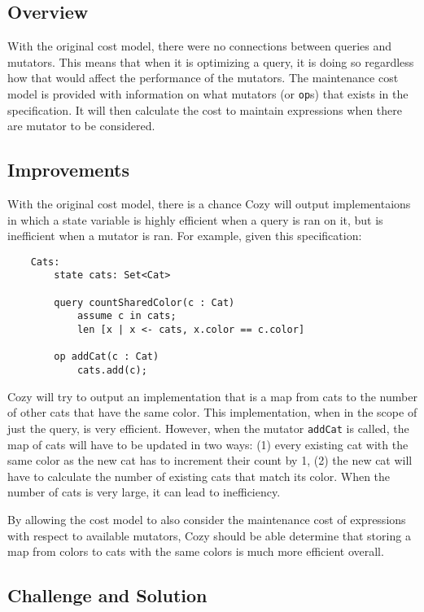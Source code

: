 \newcommand{\code}[1]{\texttt{#1}}

\subsection{Overview}
With the original cost model, there were no connections between queries and
mutators. This means that when it is optimizing a query, it is doing so
regardless how that would affect the performance of the mutators.
The maintenance cost model is provided with information on what mutators (or
\code{op}s) that exists in the specification. It will then calculate the cost to
maintain expressions when there are mutator to be considered.

\subsection{Improvements}
With the original cost model, there is a chance Cozy will output implementaions
in which a state variable is highly efficient when a query is ran on it, but
is inefficient when a mutator is ran. For example, given this specification:

\begin{lstlisting}
    Cats:
        state cats: Set<Cat>

        query countSharedColor(c : Cat)
            assume c in cats;
            len [x | x <- cats, x.color == c.color]

        op addCat(c : Cat)
            cats.add(c);
\end{lstlisting}

Cozy will try to output an implementation that is a map from cats to the number
of other cats that have the same color. This implementation, when in the scope
of just the query, is very efficient. However, when the mutator \code{addCat} is
called, the map of cats will have to be updated in two ways: (1) every existing
cat with the same color as the new cat has to increment their count by 1, (2)
the new cat will have to calculate the number of existing cats that match its
color. When the number of cats is very large, it can lead to inefficiency. 

By allowing the cost model to also consider the maintenance cost of expressions
with respect to available mutators, Cozy should be able determine that storing
a map from colors to cats with the same colors is much more efficient overall.

\subsection{Challenge and Solution}
